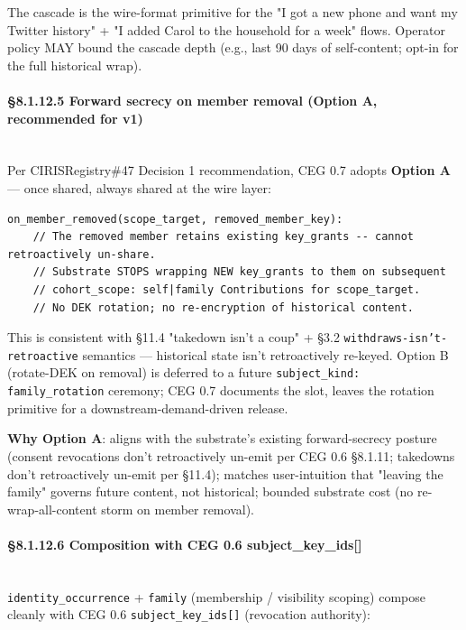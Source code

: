\documentclass[11pt]{article}
\begin{document}
The cascade is the wire-format primitive for the "I got a new phone and want my Twitter history" + "I added Carol to the household for a week" flows. Operator policy MAY bound the cascade depth (e.g., last 90 days of self-content; opt-in for the full historical wrap).


\paragraph{§8.1.12.5 Forward secrecy on member removal (Option A, recommended for v1)}\mbox{}\\


Per CIRISRegistry\#47 Decision 1 recommendation, CEG 0.7 adopts \textbf{Option A} — once shared, always shared at the wire layer:


\begin{lstlisting}
on_member_removed(scope_target, removed_member_key):
    // The removed member retains existing key_grants -- cannot retroactively un-share.
    // Substrate STOPS wrapping NEW key_grants to them on subsequent
    // cohort_scope: self|family Contributions for scope_target.
    // No DEK rotation; no re-encryption of historical content.
\end{lstlisting}

This is consistent with §11.4 "takedown isn't a coup" + §3.2 \texttt{withdraws-isn't-retroactive} semantics — historical state isn't retroactively re-keyed. Option B (rotate-DEK on removal) is deferred to a future \texttt{subject\_kind: family\_rotation} ceremony; CEG 0.7 documents the slot, leaves the rotation primitive for a downstream-demand-driven release.


\textbf{Why Option A}: aligns with the substrate's existing forward-secrecy posture (consent revocations don't retroactively un-emit per CEG 0.6 §8.1.11; takedowns don't retroactively un-emit per §11.4); matches user-intuition that "leaving the family" governs future content, not historical; bounded substrate cost (no re-wrap-all-content storm on member removal).


\paragraph{§8.1.12.6 Composition with CEG 0.6 subject\_key\_ids[]}\mbox{}\\


\texttt{identity\_occurrence} + \texttt{family} (membership / visibility scoping) compose cleanly with CEG 0.6 \texttt{subject\_key\_ids[]} (revocation authority):
\end{document}
